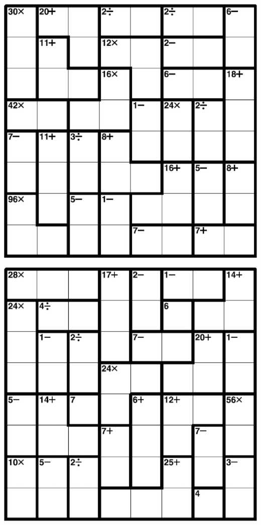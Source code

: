 
\includegraphics[scale=1]{Gambar/Lampiran/8x8_11.png}

\includegraphics[scale=1]{Gambar/Lampiran/8x8_12.png}
